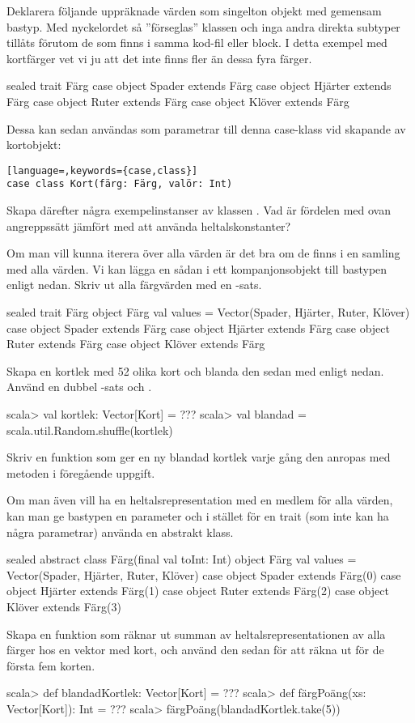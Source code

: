 \Subtask Deklarera följande uppräknade värden som singelton objekt med gemensam bastyp. Med nyckelordet  så ''förseglas'' klassen och inga andra direkta subtyper tillåts förutom de som finns i samma kod-fil eller block. I detta exempel  med kortfärger vet vi ju att det inte finns fler än dessa fyra färger.
\begin{Code}
sealed trait Färg
case object Spader extends Färg
case object Hjärter extends Färg
case object Ruter extends Färg
case object Klöver extends Färg
\end{Code}
Dessa kan sedan användas som parametrar till denna case-klass vid skapande av kortobjekt:
\begin{lstlisting}[language=,keywords={case,class}]
case class Kort(färg: Färg, valör: Int)
\end{lstlisting}
Skapa därefter några exempelinstanser av klassen . Vad är fördelen med ovan angreppssätt jämfört med att använda heltalskonstanter?

\Subtask Om man vill kunna iterera över alla värden är det bra om de finns i en samling med alla värden. Vi kan lägga en sådan i ett kompanjonsobjekt till bastypen enligt nedan. Skriv ut alla färgvärden med en -sats.

\begin{Code}
sealed trait Färg
object Färg {
  val values = Vector(Spader, Hjärter, Ruter, Klöver)
}
case object Spader extends Färg
case object Hjärter extends Färg
case object Ruter extends Färg
case object Klöver extends Färg
\end{Code}
Skapa en kortlek med 52 olika kort och blanda den sedan med  enligt nedan. Använd en dubbel -sats och .
\begin{REPL}
scala> val kortlek: Vector[Kort] = ???
scala> val blandad = scala.util.Random.shuffle(kortlek)
\end{REPL}

\Subtask Skriv en funktion  som ger en ny blandad kortlek varje gång den anropas med metoden i föregående uppgift.

\Subtask Om man även vill ha en heltalsrepresentation med en medlem  för alla värden, kan man ge bastypen en parameter och i stället för en trait (som inte kan ha några parametrar) använda en abstrakt klass.

\begin{Code}
sealed abstract class Färg(final val toInt: Int)
object Färg {
  val values = Vector(Spader, Hjärter, Ruter, Klöver)
}
case object Spader  extends Färg(0)
case object Hjärter extends Färg(1)
case object Ruter   extends Färg(2)
case object Klöver  extends Färg(3)
\end{Code}
Skapa en funktion  som räknar ut summan av heltalsrepresentationen av alla färger hos en vektor med kort, och använd den sedan för att räkna ut  för de första fem korten.
\begin{REPL}
scala> def blandadKortlek: Vector[Kort] = ???
scala> def färgPoäng(xs: Vector[Kort]): Int = ???
scala> färgPoäng(blandadKortlek.take(5))
\end{REPL}


